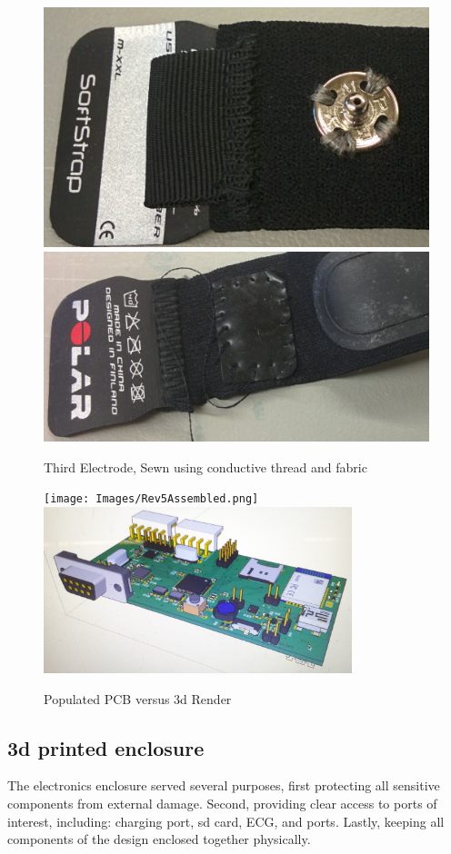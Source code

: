 \begin{figure}[h]
\begin{center}
	\label{fig:polar_3rdSnap}
	\includegraphics[angle=0,scale=1,width=.51\textwidth]{Images/Polar_top.png} 
	\includegraphics[angle=0,scale=1,width=.51\textwidth]{Images/Polar_bottom.png}
	\caption{Third Electrode, Sewn using conductive thread and fabric}
\end{center}
\end{figure}

 

\begin{figure}[h]
 \begin{center}
  \label{fig:PCBvsRender}
  \texttt{[image: Images/Rev5Assembled.png]} 
  \includegraphics[scale=1,width=0.8\textwidth]{Images/Rev5_prerender.png} 
  \caption{Populated PCB versus 3d Render}
 
 \end{center}
\end{figure}

\subsection {3d printed enclosure}
The electronics enclosure served several purposes, first protecting all sensitive components from external damage. Second, providing clear access to ports of interest, including: charging port, sd card, ECG, and  ports. Lastly, keeping all components of the design enclosed together physically. 

